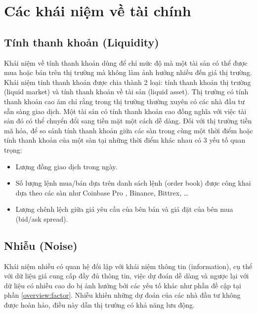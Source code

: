 \section{Các khái niệm về tài chính}
\subsection{Tính thanh khoản (Liquidity)}

Khái niệm về tính thanh khoản dùng để chỉ mức độ mà một tài sản có thể được mua hoặc bán trên thị trường mà không làm ảnh hưởng nhiều đến giá thị trường.
Khái niệm tính thanh khoản được chia thành 2 loại: tính thanh khoản thị trường (liquid market) và tính thanh khoản về tài sản (liquid asset). Thị trường có tính thanh khoản cao ám chỉ rằng trong thị trường thường xuyên có các nhà đầu tư sẵn sàng giao dịch. Một tài sản có tính thanh khoản cao đồng nghĩa với việc tài sản đó có thể chuyển đổi sang tiền mặt một cách dễ dàng. Đối với thị trường tiền mã hóa, để so sánh tính thanh khoản giữa các sàn trong cùng một thời điểm hoặc tính thanh khoản của một sàn tại những thời điểm khác nhau có 3 yếu tố quan trọng: 
\begin{itemize}
	\item Lượng đồng giao dịch trong ngày.
	\item Số lượng lệnh mua/bán dựa trên danh sách lệnh (order book) được công khai dựa theo các sàn như Coinbase Pro \cite{live-order-book}, Binance, Bittrex, \dots
	\item Lượng chênh lệch giữa giá yêu cầu của bên bán và giá đặt của bên mua (bid/ask spread).
\end{itemize}

\subsection{Nhiễu (Noise)} \label{concept:finance:noise}
Khái niệm nhiễu có quan hệ đối lập với khái niệm thông tin (information), cụ thể với dữ liệu giá cung cấp đầy đủ thông tin, việc dự đoán dễ dàng và ngược lại với dữ liệu có nhiễu cao do bị ảnh hưởng bởi các yếu tố khác như phần đề cập tại phần \ref{overview:factor}. Nhiễu khiến những dự đoán của các nhà đầu tư không được hoàn hảo, điều này dẫn thị trường có khả năng lưu động\cite{noise-in-finance}.
